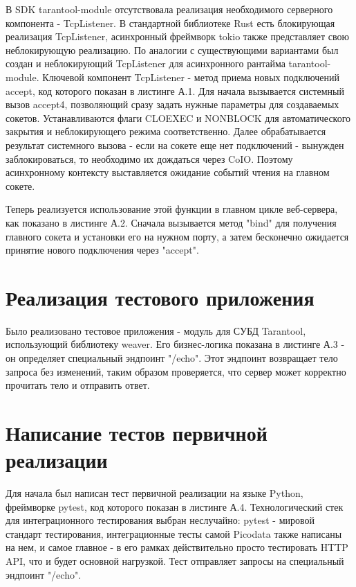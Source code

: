 \documentclass[times,numbers=noenddot]{itmo-student-thesis}
\begin{document}
В SDK tarantool-module отсутствовала реализация необходимого серверного компонента - TcpListener.
В стандартной библиотеке Rust есть блокирующая реализация TcpListener, асинхронный фреймворк tokio также представляет свою неблокирующую реализацию.
По аналогии с существующими вариантами был создан и неблокирующий TcpListener для асинхронного рантайма tarantool-module.
Ключевой компонент TcpListener - метод приема новых подключений accept, код которого показан в листинге А.1.
Для начала вызывается системный вызов accept4, позволяющий сразу задать нужные параметры для создаваемых сокетов.
Устанавливаются флаги CLOEXEC и NONBLOCK для автоматического закрытия и неблокирующего режима соответственно.
Далее обрабатывается результат системного вызова - если на сокете еще нет подключений - вынужден заблокироваться, то необходимо их дождаться через CoIO.
Поэтому асинхронному контексту выставляется ожидание событий чтения на главном сокете.

Теперь реализуется использование этой функции в главном цикле веб-сервера, как показано в листинге А.2.
Сначала вызывается метод "bind" для получения главного сокета и установки его на нужном порту, а затем бесконечно ожидается принятие нового подключения через "accept".

\section{Реализация тестового приложения}\label{sec:impl_test_app}

Было реализовано тестовое приложения - модуль для СУБД Tarantool, использующий библиотеку weaver.
Его бизнес-логика показана в листинге А.3 - он определяет специальный эндпоинт "/echo".
Этот эндпоинт возвращает тело запроса без изменений, таким образом проверяется, что сервер может корректно прочитать тело и отправить ответ.

\section{Написание тестов первичной реализации}\label{sec:impl_tests}

Для начала был написан тест первичной реализации на языке Python, фреймворке pytest, код которого показан в листинге А.4.
Технологический стек для интеграционного тестирования выбран неслучайно: pytest - мировой стандарт тестирования, интеграционные тесты самой Picodata также написаны на нем, и самое главное - в его рамках действительно просто тестировать HTTP API, что и будет основной нагрузкой.
Тест отправляет запросы на специальный эндпоинт "/echo".
\end{document}

